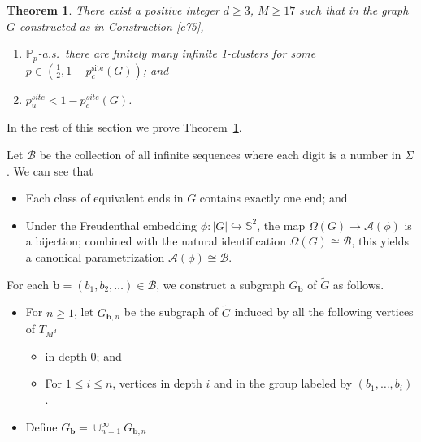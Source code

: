 \documentclass[11pt]{amsart}
\theoremstyle{plain}
\newtheorem{theorem}{Theorem}[section]
\numberwithin{equation}{section}
\numberwithin{figure}{section}
\newcommand\PP{{\mathbb P}}
\newcommand\pcs{{p_c^{\mathrm{site}}}}
\begin{document}


\begin{theorem}\label{t76}There exist a positive integer $d\geq 3$, $M\geq 17$ such that in the graph $G$ constructed as in Construction \ref{c75},
\begin{enumerate}
\item $\PP_p$-a.s.~there are finitely many infinite 1-clusters for some $p\in \left(\frac{1}{2},1-\pcs(G)\right)$; and
\item $p_u^{site}<1-p_c^{site}(G)$.
\end{enumerate}
\end{theorem}

In the rest of this section we prove Theorem~\ref{t76}.

Let $\mathcal{B}$ be the collection of all infinite sequences where each digit is a number in $\Sigma$. We can see that
\begin{itemize}
\item Each class of equivalent ends in $G$ contains exactly one end; and
\item Under the Freudenthal embedding $\phi:|G|\hookrightarrow \mathbb S^2$, the map
$\Omega(G)\to \mathcal{A}(\phi)$ is a bijection; combined with the natural identification
$\Omega(G)\cong\mathcal B$, this yields a canonical parametrization
$\mathcal{A}(\phi)\cong\mathcal B$.
\end{itemize}


For each $\mathbf{b}=(b_1,b_2,\ldots)\in\mathcal{B}$, 
we construct a subgraph $G_{\mathbf{b}}$ of $\tilde{G}$ as follows.
\begin{itemize}
\item  For $n\geq 1$, let $G_{\mathbf{b},n}$ be the subgraph of $\tilde{G}$ induced by all the following vertices of $T_{M^d}$
\begin{itemize}
\item in depth 0; and 
\item For $1\leq i\leq n$, vertices in depth $i$ and in the group labeled by $(b_1,\ldots,b_i)$.
\end{itemize}
\item Define $G_{\mathbf{b}}=\cup_{n=1}^{\infty}G_{\mathbf{b},n}$
\end{itemize}
\end{document}
